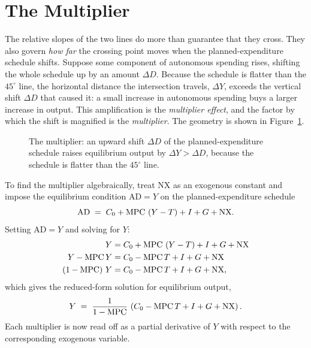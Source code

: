 
\section{The Multiplier}

The relative slopes of the two lines do more than guarantee that they cross. They also govern \emph{how far} the crossing point moves when the planned-expenditure schedule shifts. Suppose some component of autonomous spending rises, shifting the whole schedule up by an amount $\Delta D$. Because the schedule is flatter than the $45^\circ$ line, the horizontal distance the intersection travels, $\Delta Y$, exceeds the vertical shift $\Delta D$ that caused it: a small increase in autonomous spending buys a larger increase in output. This amplification is the \emph{multiplier effect}, and the factor by which the shift is magnified is the \emph{multiplier}. The geometry is shown in Figure~\ref{fig:macro-14}.

\begin{figure}[h]
\centering

\caption{The multiplier: an upward shift $\Delta D$ of the planned-expenditure schedule raises equilibrium output by $\Delta Y > \Delta D$, because the schedule is flatter than the $45^\circ$ line.}
\label{fig:macro-14}
\end{figure}

To find the multiplier algebraically, treat $\mathrm{NX}$ as an exogenous constant and impose the equilibrium condition $\mathrm{AD} = Y$ on the planned-expenditure schedule
\[
\mathrm{AD} \;=\; C_0 + \mathrm{MPC}\,\left(Y - T\right) + I + G + \mathrm{NX}.
\]
Setting $\mathrm{AD} = Y$ and solving for $Y$:
\[
\begin{aligned}
Y &= C_0 + \mathrm{MPC}\,\left(Y - T\right) + I + G + \mathrm{NX}\\
Y - \mathrm{MPC}\,Y &= C_0 - \mathrm{MPC}\,T + I + G + \mathrm{NX}\\
\left(1 - \mathrm{MPC}\right)\,Y &= C_0 - \mathrm{MPC}\,T + I + G + \mathrm{NX},
\end{aligned}
\]
which gives the reduced-form solution for equilibrium output,
\begin{equation}
Y \;=\; \frac{1}{1 - \mathrm{MPC}}\,\left(C_0 - \mathrm{MPC}\,T + I + G + \mathrm{NX}\right).
\label{eq:keynes-Y}
\end{equation}
Each multiplier is now read off as a partial derivative of $Y$ with respect to the corresponding exogenous variable.

